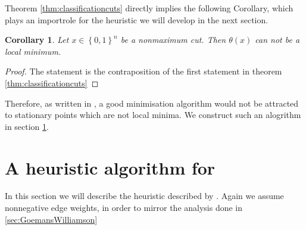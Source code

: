 \documentclass[12pt,a4paper]{article}
\theoremstyle{mythm}
\newtheorem{cor}[thm]{Corollary}
\begin{document}
Theorem \ref{thm:classificationcuts} directly implies the following Corollary, which plays an importrole for the heuristic we will develop in the next section.
\begin{cor}
Let $ x \in \left\{ 0,1 \right\} ^{ n } $ be a nonmaximum cut. Then $ \theta ( x )  $ can not be a local minimum.
\end{cor} 
\begin{proof}
The statement is the contraposition of the first statement in theorem \ref{thm:classificationcuts} 
\end{proof}
Therefore, as written in \cite[p.509]{Burer2002}, a good minimisation algorithm would not be attracted to stationary points which are not local minima. 
We construct such an alogrithm in section \ref{burerHeuristic}.
\newpage
\section{A heuristic algorithm for \MCP} 
\label{burerHeuristic} 
In this section we will describe the heuristic described by \cite{Burer2002}.
Again we assume nonnegative edge weights, in order to mirror the analysis done in \ref{sec:GoemansWilliamson} 
\end{document}
